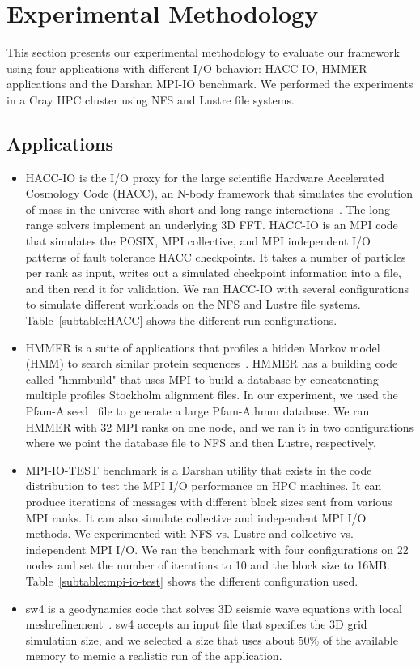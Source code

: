 \section{Experimental Methodology}\label{sec:methodology}
This section presents our experimental methodology to evaluate our
framework using four applications with different I/O behavior:
HACC-IO, HMMER applications and the Darshan MPI-IO benchmark. We performed the experiments in a Cray HPC cluster using NFS and Lustre file systems.

\subsection{Applications}
\begin{itemize}
	\item HACC-IO is the I/O proxy for the large scientific Hardware Accelerated Cosmology Code (HACC), an N-body framework that simulates the evolution of mass in the universe with short and long-range interactions~\cite{habib2013hacc}. The long-range solvers implement an underlying 3D FFT. HACC-IO is an MPI code that simulates the POSIX, MPI collective, and MPI independent I/O patterns of fault tolerance HACC checkpoints. It takes a number of particles per rank as input, writes out a simulated checkpoint information into a file, and then read it for validation. We ran HACC-IO with several configurations to simulate different workloads on the NFS and Lustre file systems. Table~\ref{subtable:HACC} shows the different run configurations. 
	\item HMMER is a suite of applications that profiles a hidden Markov model (HMM) to search similar protein sequences~\cite{eddy1992hmmer}. HMMER has a building code called "hmmbuild" that uses MPI to build a database by concatenating multiple profiles Stockholm alignment files. In our experiment, we used the Pfam-A.seed~\cite{sonnhammer1998pfam} file to generate a large Pfam-A.hmm database. We ran HMMER with 32 MPI ranks on one node, and we ran it in two configurations where we point the database file to NFS and then Lustre, respectively. 
	\item MPI-IO-TEST benchmark is a Darshan utility that exists in the code distribution to test the MPI I/O performance on HPC machines. It can produce iterations of messages with different block sizes sent from various MPI ranks. It can also simulate collective and independent MPI I/O methods. We experimented with NFS vs. Lustre and collective vs. independent MPI I/O. We ran the benchmark with four configurations on 22 nodes and set the number of iterations to 10 and the block size to 16MB. Table~\ref{subtable:mpi-io-test} shows the different configuration used.
	\item sw4 is a geodynamics code that solves 3D seismic wave equations with local meshrefinement~\cite{peterssonsw4}. sw4 accepts an input file that specifies the 3D grid simulation size, and we selected a size that uses about 50\% of the available memory to memic a realistic run of the application.
\end{itemize}

